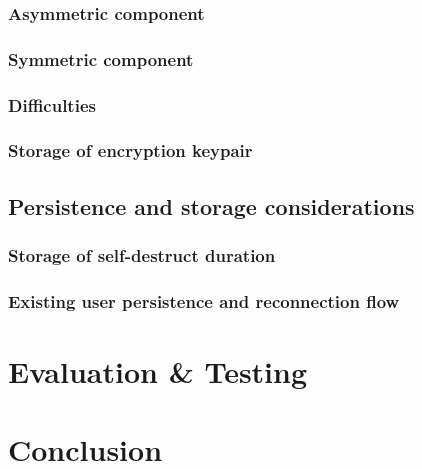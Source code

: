 \documentclass{mproj}
\begin{document}
\subsection{Asymmetric component}\label{asymmetric}

\subsection{Symmetric component}\label{symmetric}

\subsection{Difficulties}\label{encryptionDifficulties}

\subsection{Storage of encryption keypair}

\section{Persistence and storage considerations}
\subsection{Storage of self-destruct duration}
\subsection{Existing user persistence and reconnection flow}

\section{}

\section{}

\chapter{Evaluation \& Testing}\label{testing}

\chapter{Conclusion}\label{conclusion}
\end{document}
